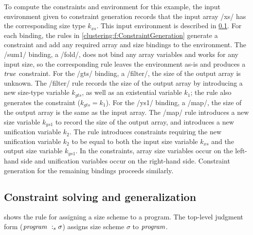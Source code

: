 To compute the constraints and environment for this example, the input environment given to constraint generation records that the input array \Hs/xs/ has the corresponding size type $k_{xs}$.
This input environment is described in \cref{clustering:s:ConstraintSolvingGen}.
For each binding, the rules in \cref{clustering:f:ConstraintGeneration} generate a constraint and add any required array and size bindings to the environment.
The \Hs/sum1/ binding, a \Hs/fold/, does not bind any array variables and works for any input size, so the corresponding rule leaves the environment as-is and produces a $\mathit{true}$ constraint.
For the \Hs/gts/ binding, a \Hs/filter/, the size of the output array is unknown.
The \Hs/filter/ rule records the size of the output array by introducing a new size-type variable $k_{gts}$, as well as an existential variable $k_1$; the rule also generates the constraint ($k_{gts} = k_1$).
For the \Hs/ys1/ binding, a \Hs/map/, the size of the output array is the same as the input array.
The \Hs/map/ rule introduces a new size variable $k_{ys1}$ to record the size of the output array, and introduces a new unification variable $k_2$.
The rule introduces constraints requiring the new unification variable $k_2$ to be equal to both the input size variable $k_{xs}$ and the output size variable $k_{ys1}$.
In the constraints, array size variables occur on the left-hand side and unification variables occur on the right-hand side.
Constraint generation for the remaining bindings proceeds similarly.


\subsection{Constraint solving and generalization}
\label{clustering:s:ConstraintSolvingGen}
 shows the rule for assigning a size scheme to a program.
The top-level judgment form ($\mathit{program} ~:_{s} \sigma$) assigns size scheme $\sigma$ to $\mathit{program}$.



